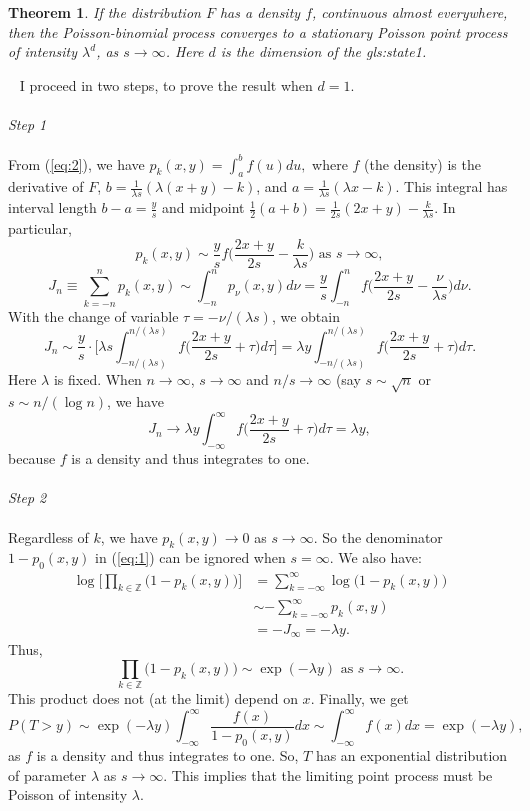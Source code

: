\documentclass[10pt]{article}
\newtheorem{theorem}{Theorem}[section]
\newenvironment{proof}[1][Proof]{\begin{trivlist}
\item[\hskip \labelsep {\bfseries #1}]}{\end{trivlist}}
\newcommand{\qed}{\nobreak \ifvmode \relax \else
      \ifdim\lastskip<1.5em \hskip-\lastskip
      \hskip1.5em plus0em minus0.5em \fi \nobreak
      \vrule height0.75em width0.5em depth0.25em\fi}
\begin{document}
\begin{theorem}
\label{sums2}
If the distribution $F$ has a density $f$, continuous almost everywhere, then the Poisson-binomial process converges to a stationary Poisson point process of intensity $\lambda^d$, as $s\rightarrow\infty$. Here $d$ is the dimension of the \gls{gls:state1}.
\end{theorem}
\begin{proof}
$ $ \newline \
I proceed in two steps, to prove the result when $d=1$.\\ \\
{\em Step 1} \\ \\
From (\ref{eq:2}), we have
$p_k(x,y) =\int_a^b f(u)du,$
where $f$ (the density) is the derivative of $F$,  $b=\frac{1}{\lambda s}(\lambda (x+y)-k)$, and $a=\frac{1}{\lambda s}(\lambda x-k)$. This integral has interval length $b-a=\frac{y}{s}$ and midpoint $\frac{1}{2}(a+b)=\frac{1}{2s}(2x+y) - \frac{k}{\lambda s}$. In particular,
$$p_k(x,y)\sim \frac{y}{s}f\Big(\frac{2x+y}{2s}-\frac{k}{\lambda s}\Big) \mbox{ as } s\rightarrow\infty,$$
$$J_n \equiv \sum_{k=-n}^{n} p_k(x,y)\sim \int_{-n}^{n}p_\nu(x,y) d\nu=
\frac{y}{s}\int_{-n}^n f\Big(\frac{2x+y}{2s}-\frac{\nu}{\lambda s}\Big)d\nu.$$
With the change of variable $\tau=-\nu/(\lambda s)$, we obtain
$$J_n \sim \frac{y}{s}\cdot \Big[\lambda s\int_{-n/(\lambda s)}^{n/(\lambda s)} f\Big(\frac{2x+y}{2s}+\tau\Big)d\tau\Big]=\lambda y\int_{-n/(\lambda s)}^{n/(\lambda s)} f\Big(\frac{2x+y}{2s}+\tau\Big)d\tau.$$
Here $\lambda$ is fixed. When $n\rightarrow\infty$, $s\rightarrow \infty$ and $n/s\rightarrow \infty$ (say $s\sim\sqrt{n}$ or $s\sim n/(\log n)$, we have
$$J_n\rightarrow \lambda y\int_{-\infty}^\infty f\Big(\frac{2x+y}{2s}+\tau\Big)d\tau =\lambda y,$$
because $f$ is a density and thus integrates to one. \\ \\
{\em Step 2} \\ \\
Regardless of $k$, we have $p_k(x,y)\rightarrow 0$ as $s\rightarrow\infty$. So the denominator $1-p_0(x,y)$ in (\ref{eq:1}) can be ignored when $s=\infty$. We also have:
\begin{align}
\log\Big[\prod_{k\in\mathbb{Z}} \Big(1-p_k(x,y)\Big)\Big] & =\sum_{k=-\infty}^\infty\log\Big(1-p_k(x,y)\Big) \nonumber \\
 & \sim -\sum_{k=-\infty}^\infty p_k(x,y) \nonumber \\
 & = -J_\infty = -\lambda y. \nonumber
\end{align}
Thus,
$$\prod_{k\in\mathbb{Z}} \Big(1-p_k(x,y)\Big)\sim \exp(-\lambda y) \mbox{ as } s\rightarrow \infty.$$
This product does not (at the limit) depend on $x$. Finally, we get
$$P(T>y)\sim \exp(-\lambda y)\int_{-\infty}^\infty \frac{f(x)}{1-p_0(x,y)}dx\sim \int_{-\infty}^\infty f(x) dx = \exp(-\lambda y),$$
as $f$ is a density and thus integrates to one. So, $T$ has an exponential distribution of parameter $\lambda$ as $s\rightarrow\infty$. This implies that the limiting point process must be Poisson of intensity $\lambda$. \qed
\end{proof}
\end{document}
